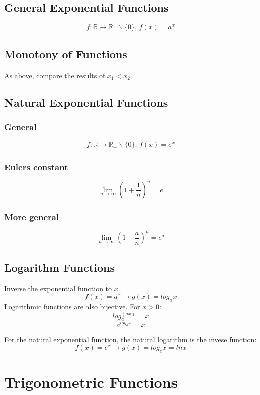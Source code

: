 \documentclass{book}
\begin{document}
\subsection{General Exponential Functions}
\[
  f:\mathbb{R} \to \mathbb{R_+}\backslash \{0\}, \,f(x) = a^x
\]

\subsection{Monotony of Functions}

As above, compare the results of $x_1 < x_2$

\subsection{Natural Exponential Functions}
\subsubsection{General}
\[
  f:\mathbb{R} \to \mathbb{R_+}\backslash \{0\}, \, f(x)=e^x
\]

\subsubsection{Eulers constant}
\[
  \lim\limits_{n \to \infty} \left(1+\frac{1}{n}\right)^n=e
\] 

\subsubsection{More general}
\[
  \lim\limits_{n \to \infty} \left(1+\frac{a}{n}\right)^n=e^a
\] 

\subsection{Logarithm Functions}
Inverse the exponential function to $x$
\[
  f(x) = a^x \rightarrow g(x)=log_ax
\]
Logarithmic functions are also bijective. For $x>0$:
\[
  log_{a}^{(ax)} = x
\]
\[
  a^{log_{a}x}=x
\]

For the natural exponential function, the natural logarithm is the invese function:
\[
  f(x) = e^x \rightarrow g(x)= log_ex=lnx
\]


\section{Trigonometric Functions}
\end{document}
